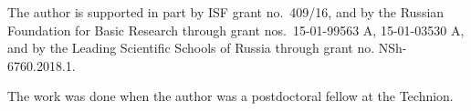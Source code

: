 \documentclass[a4paper, oneside, reqno, 12pt]{amsart}
\theoremstyle{plain}
\theoremstyle{definition}
\begin{document}
The author is supported in part by ISF grant no.\ 409/16, and by the Russian Foundation for Basic Research through grant nos.\ 15-01-99563 A, 15-01-03530 A, and by the Leading Scientific Schools of Russia through grant no. NSh-6760.2018.1.

The work was done when the author was a postdoctoral fellow at the Technion.



\end{document}
